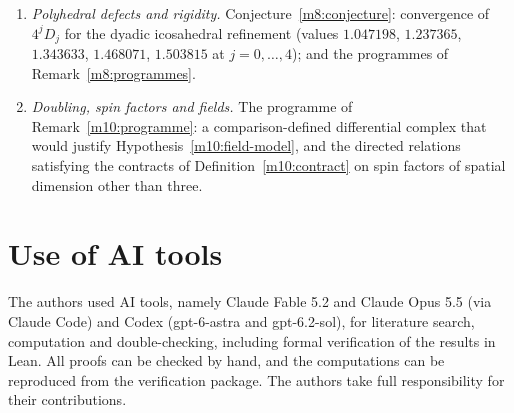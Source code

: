 \documentclass[11pt,reqno]{amsart}
\theoremstyle{definition}
\theoremstyle{remark}
\numberwithin{equation}{section}
\begin{document}
\begin{enumerate}[label=\textbf{Q\arabic*.},leftmargin=2.6em]
Proposition~\ref{m7:comparison} (a nonconstant comparison weight is excluded on $S^3$ by Proposition~\ref{m7:cocycle} but not on restricted
targets); and the anyon realisation programme of Remark~\ref{m7:anyons-programme}.
\item \emph{Polyhedral defects and rigidity.}  Conjecture~\ref{m8:conjecture}: convergence of $4^jD_j$ for the dyadic icosahedral
refinement (values $1.047198$, $1.237365$, $1.343633$, $1.468071$, $1.503815$ at $j=0,\dots,4$); and the programmes of
Remark~\ref{m8:programmes}.
\item \emph{Doubling, spin factors and fields.}  The programme of Remark~\ref{m10:programme}: a comparison-defined differential
complex that would justify Hypothesis~\ref{m10:field-model}, and the directed relations satisfying the contracts of
Definition~\ref{m10:contract} on spin factors of spatial dimension other than three.
\end{enumerate}

\section*{Use of AI tools}
The authors used AI tools, namely Claude Fable 5.2 and Claude Opus 5.5 (via Claude Code) and Codex (gpt-6-astra and gpt-6.2-sol), for literature search, computation and double-checking, including formal verification of the results in Lean. All proofs can be checked by hand, and the computations can be reproduced from the verification package. The authors take full responsibility for their contributions.
\end{document}
